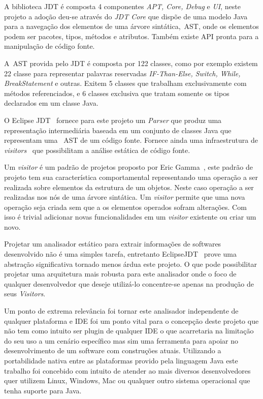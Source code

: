 A biblioteca JDT é composta 4 componentes \textit{APT, Core, Debug} e \textit{UI}, neste projeto a adoção deu-se através do \textit{JDT Core} que dispõe de uma modelo Java para a navegação dos elementos de uma árvore sintática,~\acs{AST}, onde os elementos podem ser pacotes, tipos, métodos e atributos. Também existe API pronta para a manipulação de código fonte.

A~\acs{AST} provida pelo JDT é composta por 122 classes, como por exemplo existem 22 classe para representar palavras reservadas \textit{IF-Than-Else, Switch, While, BreakStatement} e outras. Exitem 5 classes que trabalham exclusivamente com métodos referenciados, e 6 classes exclusiva que tratam somente os tipos declarados em um classe Java.

O Eclipse JDT~\cite{EclipseJDT} fornece para este projeto um \textit{Parser} que produz uma representação intermediária baseada em um conjunto de classes Java que representam uma ~\acs{AST} de um código fonte. Fornece ainda uma infraestrutura de \textit{visitors}~\cite{Gamma:1995} que possibilitam a análise estática de código fonte.

Um \textit{visitor} é um padrão de projetos proposto por Eric Gamma~\cite{Gamma:1995}, este padrão de projeto tem sua característica comportamental representando uma operação a ser realizada sobre elementos da estrutura de um objetos. Neste caso operação a ser realizadas nos nós de uma árvore sintática. Um \textit{visitor} permite que uma nova operação seja criada sem que a os elementos operados sofram alterações. Com isso é trivial adicionar novas funcionalidades em um \textit{visitor} existente ou criar um novo.

\clearpage



Projetar um analisador estático para extrair informações de softwares desenvolvido não é uma simples tarefa, entretanto EclipseJDT~\cite{EclipseJDT} prove uma abstração significativa tornado menos árdua este projeto. O que pode possibilitar projetar uma arquitetura mais robusta para este analisador onde o foco de qualquer desenvolvedor que deseje utilizá-lo concentre-se apenas na produção de seus \textit{Visitors}. 

Um ponto de extrema relevância foi tornar este analisador independente de qualquer plataforma e \acs{IDE} foi um ponto vital para o concepção deste projeto que não tem como intuito ser plugin de qualquer \acs{IDE} o que acarretaria na limitação do seu uso a um cenário específico mas sim uma ferramenta para apoiar no desenvolvimento de um software com construções atuais. Utilizando a portabilidade nativa entre as plataformas provido pela linguagem Java este trabalho foi concebido com intuito de atender ao mais diversos desenvolvedores quer utilizem Linux, Windows, Mac ou qualquer outro sistema operacional que tenha suporte para Java.

